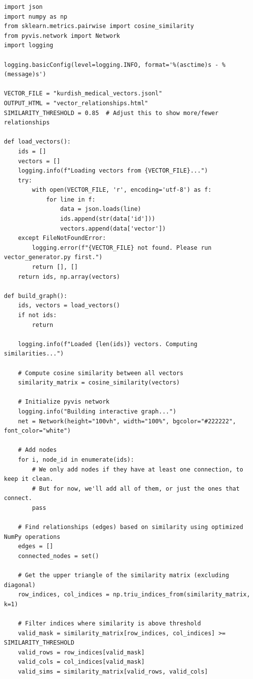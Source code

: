 \documentclass[11pt]{article}
\begin{document}
\begin{lstlisting}[style=pythoncode, caption={visualize\_vector\_relationships.py}]
import json
import numpy as np
from sklearn.metrics.pairwise import cosine_similarity
from pyvis.network import Network
import logging

logging.basicConfig(level=logging.INFO, format='%(asctime)s - %(message)s')

VECTOR_FILE = "kurdish_medical_vectors.jsonl"
OUTPUT_HTML = "vector_relationships.html"
SIMILARITY_THRESHOLD = 0.85  # Adjust this to show more/fewer relationships

def load_vectors():
    ids = []
    vectors = []
    logging.info(f"Loading vectors from {VECTOR_FILE}...")
    try:
        with open(VECTOR_FILE, 'r', encoding='utf-8') as f:
            for line in f:
                data = json.loads(line)
                ids.append(str(data['id']))
                vectors.append(data['vector'])
    except FileNotFoundError:
        logging.error(f"{VECTOR_FILE} not found. Please run vector_generator.py first.")
        return [], []
    return ids, np.array(vectors)

def build_graph():
    ids, vectors = load_vectors()
    if not ids:
        return
        
    logging.info(f"Loaded {len(ids)} vectors. Computing similarities...")
    
    # Compute cosine similarity between all vectors
    similarity_matrix = cosine_similarity(vectors)
    
    # Initialize pyvis network
    logging.info("Building interactive graph...")
    net = Network(height="100vh", width="100%", bgcolor="#222222", font_color="white")
    
    # Add nodes
    for i, node_id in enumerate(ids):
        # We only add nodes if they have at least one connection, to keep it clean.
        # But for now, we'll add all of them, or just the ones that connect.
        pass

    # Find relationships (edges) based on similarity using optimized NumPy operations
    edges = []
    connected_nodes = set()
    
    # Get the upper triangle of the similarity matrix (excluding diagonal)
    row_indices, col_indices = np.triu_indices_from(similarity_matrix, k=1)
    
    # Filter indices where similarity is above threshold
    valid_mask = similarity_matrix[row_indices, col_indices] >= SIMILARITY_THRESHOLD
    valid_rows = row_indices[valid_mask]
    valid_cols = col_indices[valid_mask]
    valid_sims = similarity_matrix[valid_rows, valid_cols]
    

\end{lstlisting}
\end{document}
